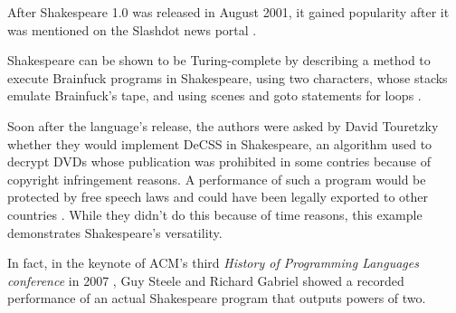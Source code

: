 After Shakespeare 1.0 was released in August 2001, it gained popularity after it was mentioned on the Slashdot news portal \cite{tjernlund2001shakespeare}.

Shakespeare can be shown to be Turing-complete by describing a method to execute Brainfuck programs in Shakespeare, using two characters, whose stacks emulate Brainfuck's tape, and using scenes and goto statements for loops \cite{stux2005shakespeare}.

Soon after the language's release, the authors were asked by David Touretzky whether they would implement DeCSS in Shakespeare, an algorithm used to decrypt DVDs whose publication was prohibited in some contries because of copyright infringement reasons. A performance of such a program would be protected by free speech laws and could have been legally exported to other countries \cite{herrick2011az}. While they didn't do this because of time reasons, this example demonstrates Shakespeare's versatility.

In fact, in the keynote of ACM's third \emph{History of Programming Languages conference} in 2007 \cite{chapiewski2007computational}, Guy Steele and Richard Gabriel showed a recorded performance of an actual Shakespeare program that outputs powers of two.
